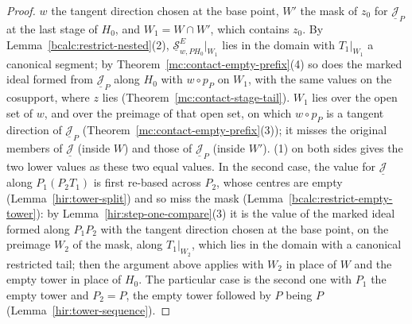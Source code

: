 \begin{proof}
\(w\) the tangent direction chosen at the base point, \(W'\) the mask of \(z_0\) for \(\underline{\mathcal J}_P\) at the last stage of \(H_0\), and \(W_1=W\cap W'\), which
contains \(z_0\). By Lemma~\ref{bcalc:restrict-nested}(2), \(\underline{\mathcal S}^E_{w,PH_0}|_{W_1}\) lies in the domain with \(T_1|_{W_1}\) a canonical segment; by
Theorem~\ref{mc:contact-empty-prefix}(4) so does the marked ideal formed from \(\underline{\mathcal J}_P\) along \(H_0\) with \(w\circ p_P\) on \(W_1\), with the same values on the
cosupport, where \(z\) lies (Theorem~\ref{mc:contact-stage-tail}). \(W_1\) lies over the open set of \(w\), and over the preimage of that open set, on which \(w\circ p_P\) is a
tangent direction of \(\underline{\mathcal J}_P\) (Theorem~\ref{mc:contact-empty-prefix}(3)); it misses the original members of \(\underline{\mathcal J}\) (inside \(W\)) and those of
\(\underline{\mathcal J}_P\) (inside \(W'\)). (1) on both sides gives the two lower values as these two equal values. In the second case, the value for
\(\underline{\mathcal J}\) along \(P_1(P_2T_1)\) is first re-based across \(P_2\), whose centres are empty (Lemma~\ref{hir:tower-split}) and so miss the mask
(Lemma~\ref{bcalc:restrict-empty-tower}): by Lemma~\ref{hir:step-one-compare}(3) it is the value of the marked ideal formed along \(P_1P_2\) with the tangent direction chosen at the
base point, on the preimage \(W_2\) of the mask, along \(T_1|_{W_2}\), which lies in the domain with a canonical restricted tail; then the argument above applies with \(W_2\) in
place of \(W\) and the empty tower in place of \(H_0\). The particular case is the second one with \(P_1\) the empty tower and \(P_2=P\), the empty tower followed
by \(P\) being \(P\) (Lemma~\ref{hir:tower-sequence}).
\end{proof}